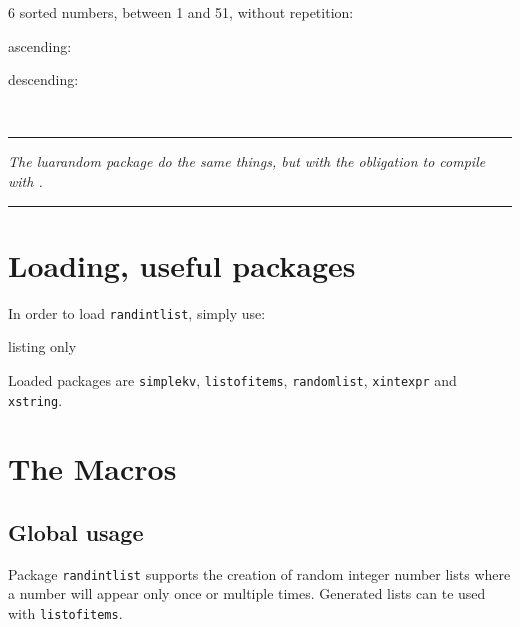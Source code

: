 \documentclass[11pt,a4paper]{ltxdoc}
\begin{document}
\begin{tcolorbox}[colframe=lightgray,colback=lightgray!5]
6 sorted numbers, between 1 and 51, without repetition:

\hfill\randintlist[min=1,max=51,nb=6,sort=asc]{\mylist}ascending: \textcolor{red}{\mylist}\hfill~

\hfill\randintlist[min=1,max=51,nb=6,sort=des,sep=>]{\mylist}descending: \textcolor{red}{\mylist}\hfill~
\end{tcolorbox}

\vfill~

\hrule

\medskip

\emph{%
	The \textsf{luarandom} package do the same things, but with the obligation to compile with .
}

\medskip

\hrule

\vspace*{5mm}

\pagebreak


\hypertarget{matoc}{}

\tableofcontents

\vspace*{5mm}


\pagebreak

\section{Loading, useful packages}

In order to load \texttt{randintlist}, simply use:

\begin{DemoCode}{listing only}
\usepackage{randintlist}
\end{DemoCode}

Loaded packages are \texttt{simplekv}, \texttt{listofitems}, \texttt{randomlist},  \texttt{xintexpr} and \texttt{xstring}.

\section{The Macros}

\subsection{Global usage}

Package \texttt{randintlist} supports the creation of random integer number lists where a number will appear only once or multiple times. Generated lists can te used with \texttt{listofitems}.
\end{document}
